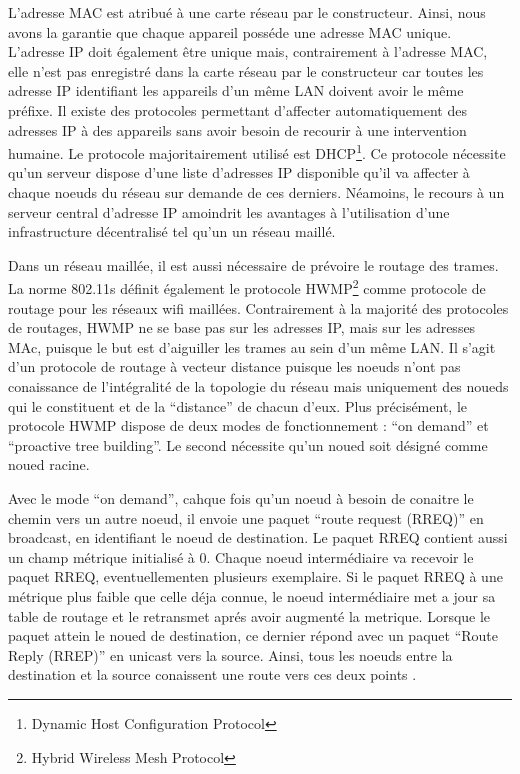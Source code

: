 L'adresse MAC est atribué à une carte réseau par le constructeur. Ainsi, nous avons la garantie que chaque appareil posséde une
adresse MAC unique. L'adresse IP doit également être unique mais, contrairement à l'adresse MAC, elle n'est pas enregistré dans
la carte réseau par le constructeur car toutes les adresse IP identifiant les appareils d'un même LAN doivent avoir le même 
préfixe. Il existe des protocoles permettant d'affecter automatiquement des adresses IP à des appareils sans avoir besoin de
recourir à une intervention humaine. Le protocole majoritairement utilisé est DHCP\footnote{Dynamic Host Configuration 
Protocol}. Ce protocole nécessite qu'un serveur dispose d'une liste d'adresses IP disponible qu'il va affecter à chaque noeuds
du réseau sur demande de ces derniers\cite{DHCP}. Néamoins, le recours à un serveur central d'adresse IP amoindrit les 
avantages à l'utilisation d'une infrastructure décentralisé tel qu'un un réseau maillé.

Dans un réseau maillée, il est aussi nécessaire de prévoire le routage des trames. La norme 802.11s définit également le protocole
HWMP\footnote{Hybrid Wireless Mesh Protocol} comme protocole de routage pour les réseaux wifi maillées. Contrairement à la majorité 
des protocoles de routages, HWMP ne se base pas sur les adresses IP, mais sur les adresses MAc, puisque le but est d'aiguiller
les trames au sein d'un même LAN. Il s'agit d'un protocole de routage à vecteur distance puisque les noeuds n'ont pas conaissance
de l'intégralité de la topologie du réseau mais uniquement des noueds qui le constituent et de la ``distance'' de chacun d'eux.
Plus précisément, le protocole HWMP dispose de deux modes de fonctionnement : ``on demand'' et ``proactive tree building''. Le
second nécessite qu'un noued soit désigné comme noued racine\cite{MNroute}.

Avec le mode ``on demand'', cahque fois qu'un noeud à besoin de conaitre le chemin vers un autre noeud, il envoie une paquet
``route request (RREQ)'' en broadcast, en identifiant le noeud de destination. Le paquet RREQ contient aussi un champ métrique
initialisé à 0. Chaque noeud intermédiaire va recevoir le paquet RREQ, eventuellementen plusieurs exemplaire. Si le paquet RREQ
à une métrique plus faible que celle déja connue, le noeud intermédiaire met a jour sa table de routage et le retransmet aprés avoir 
augmenté la metrique. Lorsque le paquet attein le noued de destination, ce dernier répond avec un paquet ``Route Reply (RREP)''
en unicast vers la source. Ainsi, tous les noeuds entre la destination et la source conaissent une route vers ces deux points
\cite{MNroute}.